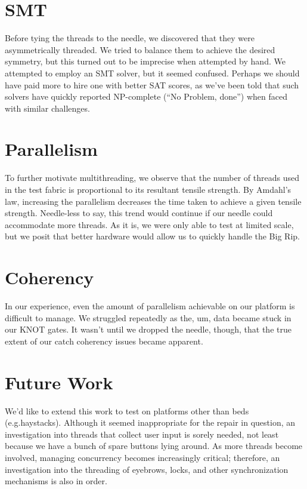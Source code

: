 \documentclass[letterpaper,12pt]{article}
\begin{document}
\begin{multicols}{2}
\section{SMT}
Before tying the threads to the needle, we discovered that they were asymmetrically threaded.
We tried to balance them to achieve the desired symmetry, but this turned out to be imprecise when attempted by hand.
We attempted to employ an SMT solver, but it seemed confused.
Perhaps we should have paid more to hire one with better SAT scores, as we've been told that such solvers have quickly reported NP-complete (``No Problem, done'') when faced with similar challenges.

\section{Parallelism}
\label{sec:parallelism}
To further motivate multithreading, we observe that the number of threads used in the test fabric is proportional to its resultant tensile strength.
By Amdahl's law, increasing the parallelism decreases the time taken to achieve a given tensile strength.
Needle-less to say, this trend would continue if our needle could accommodate more threads.
As it is, we were only able to test at limited scale, but we posit that better hardware would allow us to quickly handle the Big Rip.

\section{Coherency}
In our experience, even the amount of parallelism achievable on our platform is difficult to manage.
We struggled repeatedly as the, um, data became stuck in our KNOT gates.
It wasn't until we dropped the needle, though, that the true extent of our catch coherency issues became apparent.

\section{Future Work}
We'd like to extend this work to test on platforms other than beds (e.g.\@ haystacks).
Although it seemed inappropriate for the repair in question, an investigation into threads that collect user input is sorely needed, not least because we have a bunch of spare buttons lying around.
As more threads become involved, managing concurrency becomes increasingly critical; therefore, an investigation into the threading of eyebrows, locks, and other synchronization mechanisms is also in order.


\end{multicols}
\end{document}
